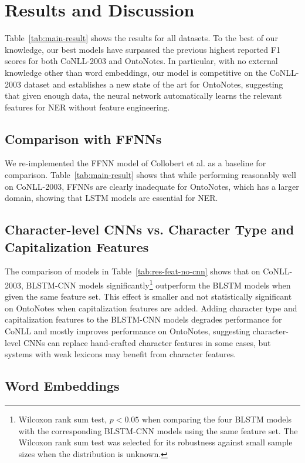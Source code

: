 \documentclass[11pt,letterpaper]{article}
\begin{document}
\section{Results and Discussion}

Table~\ref{tab:main-result} shows the results for all datasets. To the best of our knowledge, our best models have surpassed the previous highest reported F1 scores for both CoNLL-2003 and OntoNotes. In particular, with no external knowledge other than word embeddings, our model is competitive on the CoNLL-2003 dataset and establishes a new state of the art for OntoNotes, suggesting that given enough data, the neural network automatically learns the relevant features for NER without feature engineering.

\subsection{Comparison with FFNNs}

We re-implemented the FFNN model of Collobert et al.  as a baseline for comparison. Table~\ref{tab:main-result} shows that while performing reasonably well on CoNLL-2003, FFNNs are clearly inadequate for OntoNotes, which has a larger domain, showing that LSTM models are essential for NER.

\subsection{Character-level CNNs vs. Character Type and Capitalization Features}

The comparison of models in Table~\ref{tab:res-feat-no-cnn} shows that on CoNLL-2003, BLSTM-CNN models significantly\footnote{Wilcoxon rank sum test, $p < 0.05$ when comparing the four BLSTM models with the corresponding BLSTM-CNN models using the same feature set. The Wilcoxon rank sum test was selected for its robustness against small sample sizes when the distribution is unknown.} outperform the BLSTM models when given the same feature set. This effect is smaller and not statistically significant on OntoNotes when capitalization features are added. 
Adding character type and capitalization features to the BLSTM-CNN models degrades performance for CoNLL and mostly improves performance on OntoNotes, suggesting character-level CNNs can replace hand-crafted character features in some cases, but systems with weak lexicons may benefit from character features.

\subsection{Word Embeddings}
\end{document}

